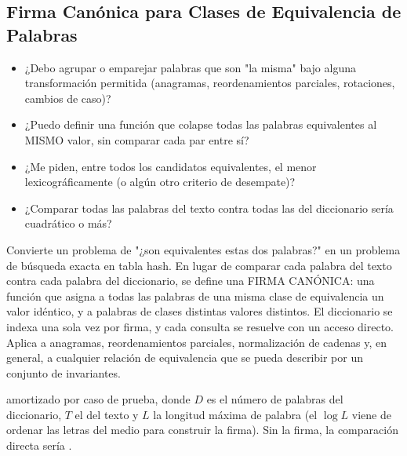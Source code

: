 \subsection{Firma Canónica para Clases de Equivalencia de Palabras}


\begin{itemize}
\item ¿Debo agrupar o emparejar palabras que son "la misma" bajo alguna transformación permitida (anagramas, reordenamientos parciales, rotaciones, cambios de caso)?
\item ¿Puedo definir una función que colapse todas las palabras equivalentes al MISMO valor, sin comparar cada par entre sí?
\item ¿Me piden, entre todos los candidatos equivalentes, el menor lexicográficamente (o algún otro criterio de desempate)?
\item ¿Comparar todas las palabras del texto contra todas las del diccionario sería cuadrático o más?
\end{itemize}

 Convierte un problema de "¿son equivalentes estas dos palabras?" en un problema de búsqueda exacta en tabla hash. En lugar de comparar cada palabra del texto contra cada palabra del diccionario, se define una FIRMA CANÓNICA: una función que asigna a todas las palabras de una misma clase de equivalencia un valor idéntico, y a palabras de clases distintas valores distintos. El diccionario se indexa una sola vez por firma, y cada consulta se resuelve con un acceso directo. Aplica a anagramas, reordenamientos parciales, normalización de cadenas y, en general, a cualquier relación de equivalencia que se pueda describir por un conjunto de invariantes.

  amortizado por caso de prueba, donde $D$ es el número de palabras del diccionario, $T$ el del texto y $L$ la longitud máxima de palabra (el $\log L$ viene de ordenar las letras del medio para construir la firma). Sin la firma, la comparación directa sería .

